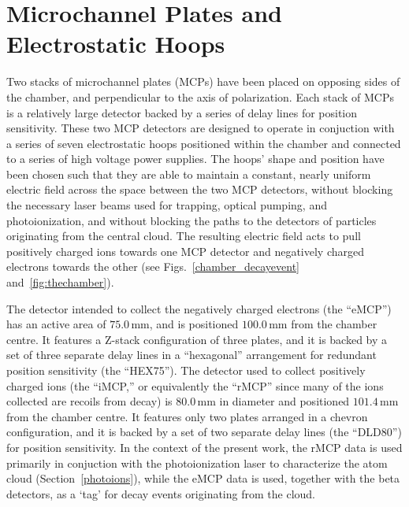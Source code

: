 \section{Microchannel Plates and Electrostatic Hoops}
\label{section:mcps}
\label{section:field}
Two stacks of microchannel plates (MCPs) have been placed on opposing sides of the chamber, and perpendicular to the axis of polarization.  Each stack of MCPs is a relatively large detector backed by a series of delay lines for position sensitivity.  These two MCP detectors are designed to operate in conjuction with a series of seven electrostatic hoops positioned within the chamber and connected to a series of high voltage power supplies.  The hoops' shape and position have been chosen such that they are able to maintain  
a constant, nearly uniform electric field across the space between the two MCP detectors, without blocking the necessary laser beams used for trapping, optical pumping, and photoionization, and without blocking the paths to the detectors of particles originating from the central cloud.
The resulting electric field acts to pull positively charged ions towards one MCP detector and negatively charged electrons towards the other (see Figs.~\ref{chamber_decayevent} and~\ref{fig:thechamber}).  


The detector intended to collect the negatively charged electrons (the ``eMCP'') has an active area of $75.0\,$mm, and is positioned 
$100.0\,$mm from the chamber centre.  It features a Z-stack configuration of three plates, and it is backed by a set of three separate delay lines in a ``hexagonal'' arrangement for redundant position sensitivity (the ``HEX75'').  The detector used to collect positively charged ions (the ``iMCP,'' or equivalently the ``rMCP'' since many of the ions collected are recoils from decay) is $80.0\,$mm in diameter and positioned $101.4\,$mm from the chamber centre.  It features only two plates arranged in a chevron configuration, and it is backed by a set of two separate delay lines (the ``DLD80'') for position sensitivity.  In the context of the present work, the rMCP data is used primarily in conjuction with the photoionization laser to characterize the atom cloud (Section~\ref{photoions}), while the eMCP data is used, together with the beta detectors, as a `tag' for decay events originating from the cloud. 

